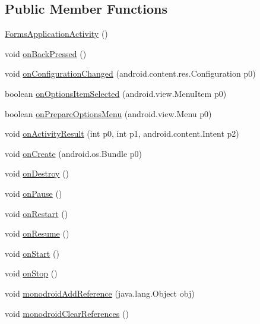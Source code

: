 \subsection*{Public Member Functions}
\begin{CompactItemize}
\item 
\hyperlink{classmd5b60ffeb829f638581ab2bb9b1a7f4f3f_1_1_forms_application_activity_3abb4f0a66515b68876a15e4a4b30e07}{FormsApplicationActivity} ()
\item 
void \hyperlink{classmd5b60ffeb829f638581ab2bb9b1a7f4f3f_1_1_forms_application_activity_022bda67b66b8d9c1cb77c43db471287}{onBackPressed} ()
\item 
void \hyperlink{classmd5b60ffeb829f638581ab2bb9b1a7f4f3f_1_1_forms_application_activity_108e7f1e4608413c4285ccd9293f10d3}{onConfigurationChanged} (android.content.res.Configuration p0)
\item 
boolean \hyperlink{classmd5b60ffeb829f638581ab2bb9b1a7f4f3f_1_1_forms_application_activity_c070d264ab8be5fc6736c1cd2a5dde74}{onOptionsItemSelected} (android.view.MenuItem p0)
\item 
boolean \hyperlink{classmd5b60ffeb829f638581ab2bb9b1a7f4f3f_1_1_forms_application_activity_5008822a00d7111588938695f58b0617}{onPrepareOptionsMenu} (android.view.Menu p0)
\item 
void \hyperlink{classmd5b60ffeb829f638581ab2bb9b1a7f4f3f_1_1_forms_application_activity_32b845a57d90dee430e79a1dd4d313de}{onActivityResult} (int p0, int p1, android.content.Intent p2)
\item 
void \hyperlink{classmd5b60ffeb829f638581ab2bb9b1a7f4f3f_1_1_forms_application_activity_664ba17cbf3ebd56c935e5951f737ce7}{onCreate} (android.os.Bundle p0)
\item 
void \hyperlink{classmd5b60ffeb829f638581ab2bb9b1a7f4f3f_1_1_forms_application_activity_02f63a90badc8b1d521dabd762926bd3}{onDestroy} ()
\item 
void \hyperlink{classmd5b60ffeb829f638581ab2bb9b1a7f4f3f_1_1_forms_application_activity_b60f995ef62dc4facec3f9f33cff8a55}{onPause} ()
\item 
void \hyperlink{classmd5b60ffeb829f638581ab2bb9b1a7f4f3f_1_1_forms_application_activity_a1824a9a5587af10b534406d8b8bc137}{onRestart} ()
\item 
void \hyperlink{classmd5b60ffeb829f638581ab2bb9b1a7f4f3f_1_1_forms_application_activity_bf7623ad3707e398b62e6a98b23091c8}{onResume} ()
\item 
void \hyperlink{classmd5b60ffeb829f638581ab2bb9b1a7f4f3f_1_1_forms_application_activity_14cbfd53ce03eda40b28f39d28f24464}{onStart} ()
\item 
void \hyperlink{classmd5b60ffeb829f638581ab2bb9b1a7f4f3f_1_1_forms_application_activity_64374f0d736d5898daa13bf81ca1f3a0}{onStop} ()
\item 
void \hyperlink{classmd5b60ffeb829f638581ab2bb9b1a7f4f3f_1_1_forms_application_activity_2c4010f783599213a274f63e6d5fd3d3}{monodroidAddReference} (java.lang.Object obj)
\item 
void \hyperlink{classmd5b60ffeb829f638581ab2bb9b1a7f4f3f_1_1_forms_application_activity_837c4f559a7030eedd33be67a0272eaf}{monodroidClearReferences} ()
\end{CompactItemize}

